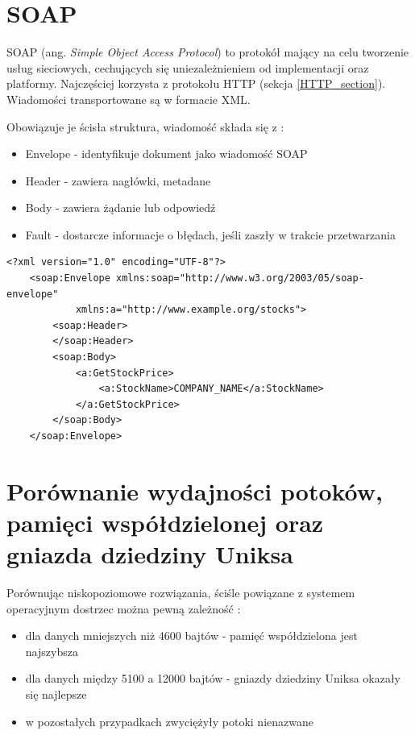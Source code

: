 \section{SOAP}

SOAP (ang. \textit{Simple Object Access Protocol}) to protokół mający na celu tworzenie usług sieciowych, cechujących się uniezależnieniem od implementacji oraz platformy. Najczęściej korzysta z protokołu HTTP (sekcja \ref{HTTP_section}). Wiadomości transportowane są w formacie XML.

Obowiązuje je ścisła struktura, wiadomość składa się z \cite{SOAP}:
\begin{itemize}
    \item Envelope - identyfikuje dokument jako wiadomość SOAP
    \item Header - zawiera nagłówki, metadane
    \item Body - zawiera żądanie lub odpowiedź
    \item Fault - dostarcze informacje o błędach, jeśli zaszły w trakcie przetwarzania
\end{itemize}

\begin{lstlisting}[caption={Przykład zapytania, które jest zgodne z protokołem SOAP},captionpos=b]
    <?xml version="1.0" encoding="UTF-8"?>
    <soap:Envelope xmlns:soap="http://www.w3.org/2003/05/soap-envelope"
            xmlns:a="http://www.example.org/stocks">
        <soap:Header>
        </soap:Header>
        <soap:Body>
            <a:GetStockPrice>
                <a:StockName>COMPANY_NAME</a:StockName>
            </a:GetStockPrice>
        </soap:Body>
    </soap:Envelope>
\end{lstlisting}


\section{Porównanie wydajności potoków, pamięci współdzielonej oraz gniazda dziedziny Uniksa}

Porównując niskopoziomowe rozwiązania, ściśle powiązane z systemem operacyjnym dostrzec można pewną zależność \cite{ZX2011}:

\begin{itemize}
    \item dla danych mniejszych niż 4600 bajtów - pamięć współdzielona jest najszybsza
    \item dla danych między 5100 a 12000 bajtów - gniazdy dziedziny Uniksa okazały się najlepsze
    \item w pozostałych przypadkach zwyciężyły potoki nienazwane
\end{itemize}
